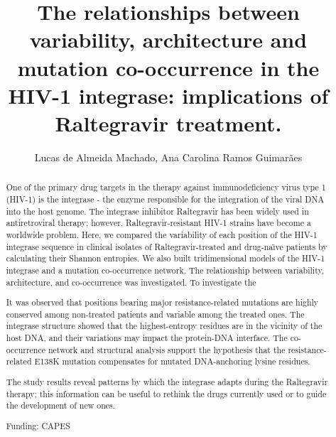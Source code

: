 \documentclass[twoside]{article}
\title{\vspace{-15mm}\fontsize{24pt}{10pt}\selectfont\textbf{ The relationships between variability,  architecture and mutation co-occurrence in the HIV-1 integrase: implications of Raltegravir treatment. }} %
\author{ Lucas de Almeida Machado, Ana Carolina Ramos Guimar\~aes }
\affil{ Fiocruz }
\date{}
\begin{document}
  
  
  \maketitle %
  
  
  \thispagestyle{fancy} %
  
  
  \begin{abstract}
  One of the primary drug targets in the therapy against immunodeficiency virus type 1 (HIV-1) is the integrase - the enzyme responsible for the integration of the viral DNA into the host genome. The integrase inhibitor Raltegravir has been widely used in antiretroviral therapy; however,  Raltegravir-resistant HIV-1 strains have become a worldwide problem. Here,  we compared the variability of each position of the HIV-1 integrase sequence in clinical isolates of Raltegravir-treated and drug-na\"{\i}ve patients by calculating their Shannon entropies. We also built tridimensional models of the HIV-1 integrase and a mutation co-occurrence network. The relationship between variability,  architecture,  and co-occurrence was investigated. To investigate the  

It was observed that positions bearing major resistance-related mutations are highly conserved among non-treated patients and variable among the treated ones. The integrase structure showed that the highest-entropy residues are in the vicinity of the host DNA,  and their variations may impact the protein-DNA interface. The co-occurrence network and structural analysis support the hypothesis that the resistance-related E138K mutation compensates for mutated DNA-anchoring lysine residues.  

The study results reveal patterns by which the integrase adapts during the Raltegravir therapy; this information can be useful to rethink the drugs currently used or to guide the development of new ones.
  
  Funding: CAPES \\ 
  \end{abstract}
  
\end{document}
